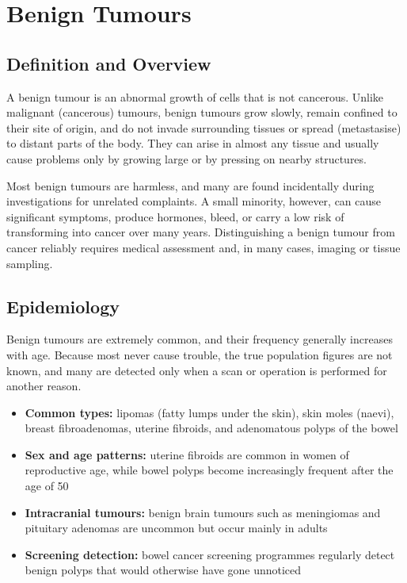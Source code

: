 \chapter{Benign Tumours}

\section*{Definition and Overview}
A benign tumour is an abnormal growth of cells that is not cancerous. Unlike malignant (cancerous) tumours, benign tumours grow slowly, remain confined to their site of origin, and do not invade surrounding tissues or spread (metastasise) to distant parts of the body. They can arise in almost any tissue and usually cause problems only by growing large or by pressing on nearby structures.

Most benign tumours are harmless, and many are found incidentally during investigations for unrelated complaints. A small minority, however, can cause significant symptoms, produce hormones, bleed, or carry a low risk of transforming into cancer over many years. Distinguishing a benign tumour from cancer reliably requires medical assessment and, in many cases, imaging or tissue sampling.

\section*{Epidemiology}
Benign tumours are extremely common, and their frequency generally increases with age. Because most never cause trouble, the true population figures are not known, and many are detected only when a scan or operation is performed for another reason.

\begin{itemize}
    \item \textbf{Common types:} lipomas (fatty lumps under the skin), skin moles (naevi), breast fibroadenomas, uterine fibroids, and adenomatous polyps of the bowel
    \item \textbf{Sex and age patterns:} uterine fibroids are common in women of reproductive age, while bowel polyps become increasingly frequent after the age of 50
    \item \textbf{Intracranial tumours:} benign brain tumours such as meningiomas and pituitary adenomas are uncommon but occur mainly in adults
    \item \textbf{Screening detection:} bowel cancer screening programmes regularly detect benign polyps that would otherwise have gone unnoticed
\end{itemize}

